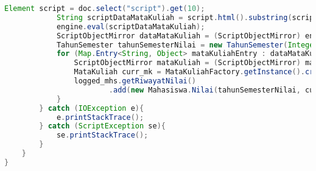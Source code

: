 \begin{lstlisting}[language=Java,basicstyle=\tiny,caption=MultipleRequest.java]
            Element script = doc.select("script").get(10);
            String scriptDataMataKuliah = script.html().substring(script.html().indexOf("var data_mata_kuliah = [];"), script.html().indexOf("var data_angket = [];"));
            engine.eval(scriptDataMataKuliah);
            ScriptObjectMirror dataMataKuliah = (ScriptObjectMirror) engine.get("data_mata_kuliah");
            TahunSemester tahunSemesterNilai = new TahunSemester(Integer.parseInt(thn), sem.charAt(0));
            for (Map.Entry<String, Object> mataKuliahEntry : dataMataKuliah.entrySet()) {
                ScriptObjectMirror mataKuliah = (ScriptObjectMirror) mataKuliahEntry.getValue();
                MataKuliah curr_mk = MataKuliahFactory.getInstance().createMataKuliah((String) mataKuliah.get("kode_mata_kuliah"), Integer.parseInt((String) mataKuliah.get("jumlah_sks")), (String) mataKuliah.get("nama_mata_kuliah"));
                logged_mhs.getRiwayatNilai()
                        .add(new Mahasiswa.Nilai(tahunSemesterNilai, curr_mk, (String) mataKuliah.get("na")));
            }
        } catch (IOException e){
            e.printStackTrace();
        } catch (ScriptException se){
            se.printStackTrace();
        }
    }
}
\end{lstlisting}
